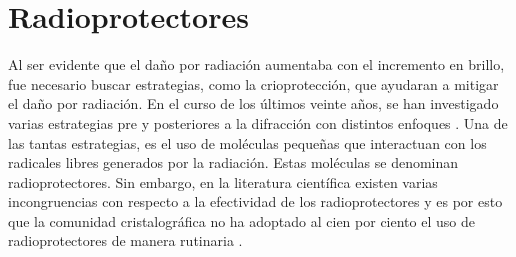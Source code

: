 \section{Radioprotectores}
Al ser evidente que el daño por radiación aumentaba con el incremento en brillo, fue necesario buscar estrategias, como la crioprotección, que ayudaran a mitigar el daño por radiación. En el curso de los últimos veinte años, se han investigado varias estrategias pre y posteriores a la difracción con distintos enfoques . Una de las tantas estrategias, es el uso de moléculas pequeñas que interactuan con los radicales libres generados por la radiación. Estas moléculas se denominan radioprotectores. Sin embargo, en la literatura científica existen varias incongruencias con respecto a la efectividad de los radioprotectores y es por esto que la comunidad cristalográfica no ha adoptado al cien por ciento el uso de radioprotectores de manera rutinaria .
